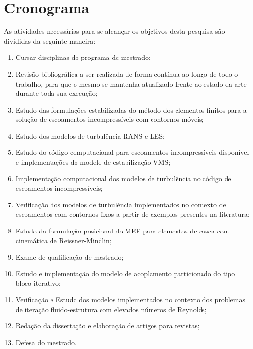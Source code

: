 \section{Cronograma}


As atividades necessárias para se alcançar os objetivos desta pesquisa são divididas da seguinte maneira:

\begin{enumerate}[label=\alph*.]
	\item\label{M:1} Cursar disciplinas do programa de mestrado;
	\item\label{M:2} Revisão bibliográfica a ser realizada de forma contínua ao longo de todo o trabalho, para que o mesmo se mantenha atualizado frente ao estado da arte durante toda sua execução;
	\item\label{M:3} Estudo das formulações estabilizadas do método dos elementos finitos para a solução de escoamentos incompressíveis com contornos móveis;
	\item\label{M:4} Estudo dos modelos de turbulência RANS e LES;
	\item\label{M:5} Estudo do código computacional para escoamentos incompressíveis disponível e implementações do modelo de estabilização VMS;
	\item\label{M:6} Implementação computacional dos modelos de turbulência no código de escoamentos incompressíveis;
	\item\label{M:7} Verificação dos modelos de turbulência implementados no contexto de escoamentos com contornos fixos a partir de exemplos presentes na literatura;
	\item\label{M:8} Estudo da formulação posicional do MEF para elementos de casca com cinemática de Reissner-Mindlin;
	\item\label{M:9} Exame de qualificação de mestrado;
	\item\label{M:10} Estudo e implementação do modelo de acoplamento particionado do tipo bloco-iterativo;
	\item\label{M:11} Verificação e Estudo dos modelos implementados no contexto dos problemas de iteração fluido-estrutura com elevados números de Reynolds;
	\item\label{M:12} Redação da dissertação e elaboração de artigos para revistas;
	\item \label{M:13} Defesa do mestrado.
\end{enumerate}

